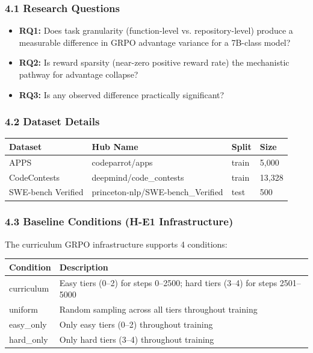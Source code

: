 
\subsubsection{4.1 Research Questions}

\begin{itemize}
\item \textbf{RQ1:} Does task granularity (function-level vs. repository-level) produce a measurable difference in GRPO advantage variance for a 7B-class model?
\item \textbf{RQ2:} Is reward sparsity (near-zero positive reward rate) the mechanistic pathway for advantage collapse?
\item \textbf{RQ3:} Is any observed difference practically significant?
\end{itemize}

\subsubsection{4.2 Dataset Details}

\begin{table}[htbp]
\centering
\begin{tabular}{llll}
\toprule
Dataset & Hub Name & Split & Size \\
\midrule
APPS & codeparrot/apps & train & 5,000 \\
CodeContests & deepmind/code_contests & train & 13,328 \\
SWE-bench Verified & princeton-nlp/SWE-bench_Verified & test & 500 \\
\bottomrule
\end{tabular}
\end{table}

\subsubsection{4.3 Baseline Conditions (H-E1 Infrastructure)}

The curriculum GRPO infrastructure supports 4 conditions:

\begin{table}[htbp]
\centering
\begin{tabular}{ll}
\toprule
Condition & Description \\
\midrule
curriculum & Easy tiers (0–2) for steps 0–2500; hard tiers (3–4) for steps 2501–5000 \\
uniform & Random sampling across all tiers throughout training \\
easy_only & Only easy tiers (0–2) throughout training \\
hard_only & Only hard tiers (3–4) throughout training \\
\bottomrule
\end{tabular}
\end{table}

